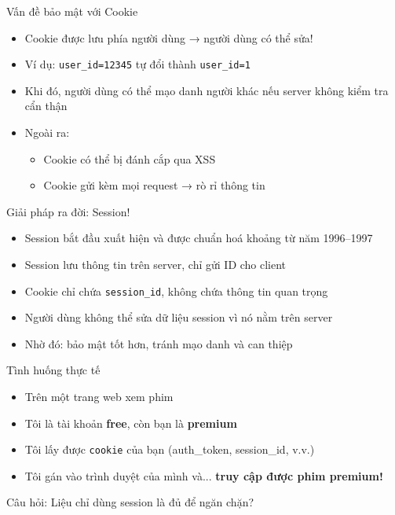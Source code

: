\documentclass[aspectratio=169]{beamer}
\begin{document}
\begin{frame}{Vấn đề bảo mật với Cookie}
  \begin{itemize}
    \item Cookie được lưu phía người dùng → người dùng có thể sửa!
    \item Ví dụ: \texttt{user\_id=12345} tự đổi thành \texttt{user\_id=1}
    \item Khi đó, người dùng có thể mạo danh người khác nếu server không kiểm tra cẩn thận
    \item Ngoài ra:
    \begin{itemize}
      \item Cookie có thể bị đánh cắp qua XSS
      \item Cookie gửi kèm mọi request → rò rỉ thông tin
    \end{itemize}
  \end{itemize}
\end{frame}

\begin{frame}{Giải pháp ra đời: Session!}
  \begin{itemize}
    \item Session bắt đầu xuất hiện và được chuẩn hoá khoảng từ năm 1996–1997
    \item Session lưu thông tin trên server, chỉ gửi ID cho client
    \item Cookie chỉ chứa \texttt{session\_id}, không chứa thông tin quan trọng
    \item Người dùng không thể sửa dữ liệu session vì nó nằm trên server
    \item Nhờ đó: bảo mật tốt hơn, tránh mạo danh và can thiệp
  \end{itemize}
\end{frame}

\begin{frame}{Tình huống thực tế 🤔}
\begin{itemize}
  \item Trên một trang web xem phim
  \item Tôi là tài khoản \textbf{free}, còn bạn là \textbf{premium}
  \item Tôi lấy được \texttt{cookie} của bạn (auth\_token, session\_id, v.v.)
  \item Tôi gán vào trình duyệt của mình và... \textbf{truy cập được phim premium!}
\end{itemize}

\vspace{1em}
\alert{Câu hỏi:} Liệu chỉ dùng session là đủ để ngăn chặn?
\end{frame}
\end{document}
